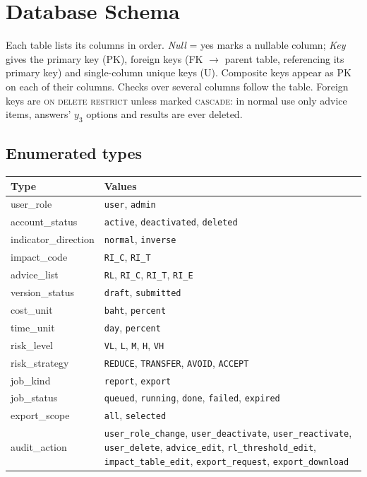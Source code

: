 \documentclass[11pt,a4paper]{article}
\begin{document}
\needspace{0.5\textheight}\section{Database Schema}\label{sec:schema}

Each table lists its columns in order. \emph{Null} = yes marks a nullable column; \emph{Key} gives the primary key (PK), foreign keys (FK $\to$ parent table, referencing its primary key) and single-column unique keys (U). Composite keys appear as PK on each of their columns. Checks over several columns follow the table. Foreign keys are \textsc{on delete restrict} unless marked \textsc{cascade}: in normal use only advice items, answers' $y_3$ options and results are ever deleted.

\subsection{Enumerated types}
{\small
\begin{tabularx}{\linewidth}{@{}>{\ttfamily}l Y@{}}
\toprule{}\normalfont Type & Values \\ \midrule
user\_role & \texttt{user}, \texttt{admin} \\
account\_status & \texttt{active}, \texttt{deactivated}, \texttt{deleted} \\
indicator\_direction & \texttt{normal}, \texttt{inverse} \\
impact\_code & \texttt{RI\_C}, \texttt{RI\_T} \\
advice\_list & \texttt{RL}, \texttt{RI\_C}, \texttt{RI\_T}, \texttt{RI\_E} \\
version\_status & \texttt{draft}, \texttt{submitted} \\
cost\_unit & \texttt{baht}, \texttt{percent} \\
time\_unit & \texttt{day}, \texttt{percent} \\
risk\_level & \texttt{VL}, \texttt{L}, \texttt{M}, \texttt{H}, \texttt{VH} \\
risk\_strategy & \texttt{REDUCE}, \texttt{TRANSFER}, \texttt{AVOID}, \texttt{ACCEPT} \\
job\_kind & \texttt{report}, \texttt{export} \\
job\_status & \texttt{queued}, \texttt{running}, \texttt{done}, \texttt{failed}, \texttt{expired} \\
export\_scope & \texttt{all}, \texttt{selected} \\
audit\_action & \texttt{user\_role\_change}, \texttt{user\_deactivate}, \texttt{user\_reactivate}, \texttt{user\_delete}, \texttt{advice\_edit}, \texttt{rl\_threshold\_edit}, \texttt{impact\_table\_edit}, \texttt{export\_request}, \texttt{export\_download} \\
\bottomrule
\end{tabularx}}
\end{document}
